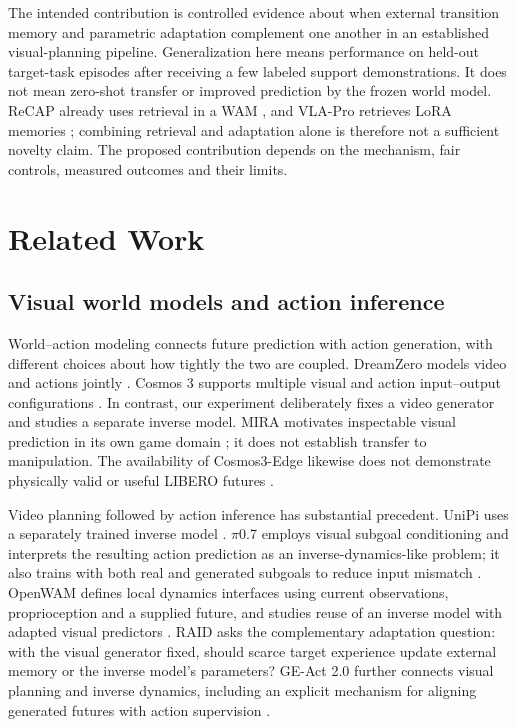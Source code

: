 \documentclass[11pt,a4paper]{article}
\begin{document}
The intended contribution is controlled evidence about when external transition memory and parametric adaptation complement one another in an established visual-planning pipeline. Generalization here means performance on held-out target-task episodes after receiving a few labeled support demonstrations. It does not mean zero-shot transfer or improved prediction by the frozen world model. ReCAP already uses retrieval in a WAM \cite{ref40}, and VLA-Pro retrieves LoRA memories \cite{ref28}; combining retrieval and adaptation alone is therefore not a sufficient novelty claim. The proposed contribution depends on the mechanism, fair controls, measured outcomes and their limits.

\section{Related Work}

\subsection{Visual world models and action inference}

World--action modeling connects future prediction with action generation, with different choices about how tightly the two are coupled. DreamZero models video and actions jointly \cite{ref33}. Cosmos 3 supports multiple visual and action input--output configurations \cite{ref32}. In contrast, our experiment deliberately fixes a video generator and studies a separate inverse model. MIRA motivates inspectable visual prediction in its own game domain \cite{ref1}; it does not establish transfer to manipulation. The availability of Cosmos3-Edge likewise does not demonstrate physically valid or useful LIBERO futures \cite{ref7}.

Video planning followed by action inference has substantial precedent. UniPi uses a separately trained inverse model \cite{ref2}. \(\pi\)0.7 employs visual subgoal conditioning and interprets the resulting action prediction as an inverse-dynamics-like problem; it also trains with both real and generated subgoals to reduce input mismatch \cite{ref30}. OpenWAM defines local dynamics interfaces using current observations, proprioception and a supplied future, and studies reuse of an inverse model with adapted visual predictors \cite{ref31}. RAID asks the complementary adaptation question: with the visual generator fixed, should scarce target experience update external memory or the inverse model's parameters? GE-Act 2.0 further connects visual planning and inverse dynamics, including an explicit mechanism for aligning generated futures with action supervision \cite{ref39}.
\end{document}
